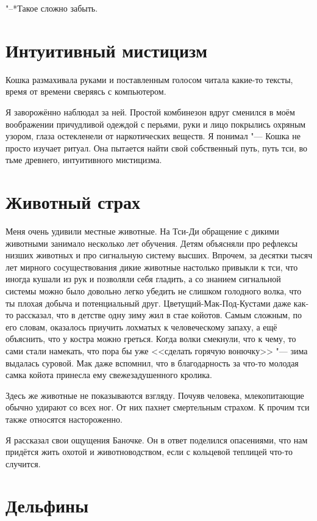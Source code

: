 \documentclass[a4paper,10pt]{book}
\begin{document}
"--*Такое сложно забыть.

\section{Интуитивный мистицизм}
 
Кошка размахивала руками и поставленным голосом читала какие-то тексты, время 
от времени сверяясь с компьютером.

Я заворожённо наблюдал за ней. Простой комбинезон вдруг сменился в моём 
воображении причудливой одеждой с перьями, руки и лицо покрылись охряным 
узором, глаза остекленели от наркотических веществ. Я понимал "--- Кошка не 
просто изучает ритуал. Она пытается найти свой собственный путь, путь тси, во 
тьме древнего, интуитивного мистицизма.
 
\section{Животный страх}

Меня очень удивили местные животные. На Тси-Ди обращение с дикими животными 
занимало несколько лет обучения. Детям объясняли про рефлексы низших животных и 
про сигнальную систему высших. Впрочем, за десятки тысяч лет мирного 
сосуществования дикие животные настолько привыкли к тси, что иногда кушали из 
рук и позволяли себя гладить, а со знанием сигнальной системы можно было 
довольно легко убедить не слишком голодного волка, что ты плохая добыча и 
потенциальный друг. Цветущий-Мак-Под-Кустами даже как-то рассказал, что в 
детстве одну зиму жил в стае койотов. Самым сложным, по его словам, оказалось 
приучить лохматых к человеческому запаху, а ещё объяснить, что у костра можно 
греться. Когда волки смекнули, что к чему, то сами стали намекать, что пора бы 
уже <<сделать горячую вонючку>> "--- зима выдалась суровой. Мак даже вспомнил, 
что в благодарность за что-то молодая самка койота принесла ему 
свежезадушенного кролика.

Здесь же животные не показываются взгляду. Почуяв человека, млекопитающие 
обычно удирают со всех ног. От них пахнет смертельным страхом. К прочим тси 
также относятся настороженно.

Я рассказал свои ощущения Баночке. Он в ответ поделился опасениями, что нам 
придётся жить охотой и животноводством, если с кольцевой теплицей что-то 
случится.

\section{Дельфины}
\end{document}
